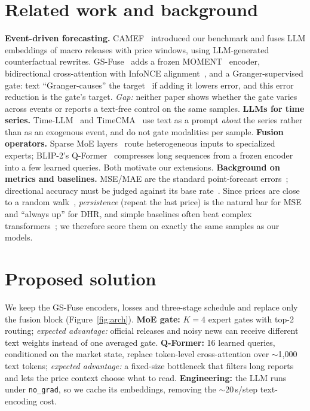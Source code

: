 \documentclass{article}
\begin{document}
\section{Related work and background}
\textbf{Event-driven forecasting.} CAMEF~\cite{camef} introduced our benchmark and fuses LLM embeddings of macro releases with price windows, using LLM-generated counterfactual rewrites. GS-Fuse~\cite{gsfuse} adds a frozen MOMENT~\cite{moment} encoder, bidirectional cross-attention with InfoNCE alignment~\cite{cpc}, and a Granger-supervised gate: text ``Granger-causes'' the target~\cite{granger} if adding it lowers error, and this error reduction is the gate's target. \emph{Gap:} neither paper shows whether the gate varies across events or reports a text-free control on the same samples.
\textbf{LLMs for time series.} Time-LLM~\cite{timellm} and TimeCMA~\cite{timecma} use text as a prompt \emph{about} the series rather than as an exogenous event, and do not gate modalities per sample.
\textbf{Fusion operators.} Sparse MoE layers~\cite{shazeer2017,switch} route heterogeneous inputs to specialized experts; BLIP-2's Q-Former~\cite{blip2} compresses long sequences from a frozen encoder into a few learned queries. Both motivate our extensions.
\textbf{Background on metrics and baselines.} MSE/MAE are the standard point-forecast errors~\cite{hyndman}; directional accuracy must be judged against its base rate~\cite{pesaran}. Since prices are close to a random walk~\cite{fama}, \emph{persistence} (repeat the last price) is the natural bar for MSE and ``always up'' for DHR, and simple baselines often beat complex transformers~\cite{dlinear}; we therefore score them on exactly the same samples as our models.

\section{Proposed solution}
We keep the GS-Fuse encoders, losses and three-stage schedule and replace only the fusion block (Figure~\ref{fig:arch}).
\textbf{MoE gate:} $K=4$ expert gates with top-2 routing; \emph{expected advantage:} official releases and noisy news can receive different text weights instead of one averaged gate.
\textbf{Q-Former:} 16 learned queries, conditioned on the market state, replace token-level cross-attention over $\sim$1{,}000 text tokens; \emph{expected advantage:} a fixed-size bottleneck that filters long reports and lets the price context choose what to read.
\textbf{Engineering:} the LLM runs under \texttt{no\_grad}, so we cache its embeddings, removing the $\sim$20\,s/step text-encoding cost.
\end{document}
